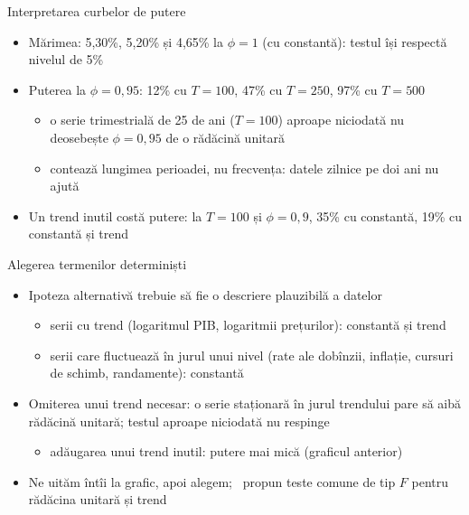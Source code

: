 \begin{frame}{Interpretarea curbelor de putere}
\itemsize{\small}
\begin{itemize}
    \item Mărimea: 5{,}30\%, 5{,}20\% și 4{,}65\% la $\phi = 1$ (cu constantă): testul își respectă nivelul de 5\%
    \item Puterea la $\phi = 0{,}95$: 12\% cu $T = 100$, 47\% cu $T = 250$, 97\% cu $T = 500$
    \begin{itemize}
        \item o serie trimestrială de 25 de ani ($T = 100$) aproape niciodată nu deosebește $\phi = 0{,}95$ de o rădăcină unitară
        \item contează lungimea perioadei, nu frecvența: datele zilnice pe doi ani nu ajută
    \end{itemize}
    \item Un trend inutil costă putere: la $T = 100$ și $\phi = 0{,}9$, 35\% cu constantă, 19\% cu constantă și trend
\end{itemize}
\end{frame}

\begin{frame}{Alegerea termenilor determiniști}
\itemsize{\small}
\begin{itemize}
    \item Ipoteza alternativă trebuie să fie o descriere plauzibilă a datelor
    \begin{itemize}
        \item serii cu trend (logaritmul PIB, logaritmii prețurilor): constantă și trend
        \item serii care fluctuează în jurul unui nivel (rate ale dobînzii, inflație, cursuri de schimb, randamente): constantă
    \end{itemize}
    \item Omiterea unui trend necesar: o serie staționară în jurul trendului pare să aibă rădăcină unitară; testul aproape niciodată nu respinge
    \begin{itemize}
        \item adăugarea unui trend inutil: putere mai mică (graficul anterior)
    \end{itemize}
    \item Ne uităm întîi la grafic, apoi alegem; \ propun teste comune de tip $F$ pentru rădăcina unitară și trend
\end{itemize}
\end{frame}

